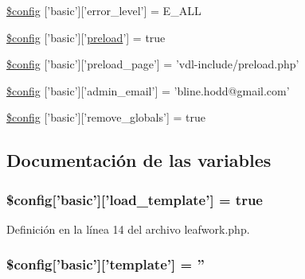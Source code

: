 \begin{DoxyCompactItemize}
\hyperlink{config_2leafwork_8php_a02fae42f7bd39779a246e6eef57ea649}{\$config} \mbox{[}'basic'\mbox{]}\mbox{[}'error\-\_\-level'\mbox{]} = E\-\_\-\-A\-L\-L
\item 
\hyperlink{config_2leafwork_8php_ab18150a408cc72381f076781e1d2c5f7}{\$config} \mbox{[}'basic'\mbox{]}\mbox{[}'\hyperlink{core_2leafwork_8php_a9a850f83b0ef276b15990509daca45cf}{preload}'\mbox{]} = true
\item 
\hyperlink{config_2leafwork_8php_a1d820c59c553e9ef698341bea6cb583b}{\$config} \mbox{[}'basic'\mbox{]}\mbox{[}'preload\-\_\-page'\mbox{]} = 'vdl-\/include/preload.\-php'
\item 
\hyperlink{config_2leafwork_8php_a9ba3340a1a3d600f3032680c1ccca82f}{\$config} \mbox{[}'basic'\mbox{]}\mbox{[}'admin\-\_\-email'\mbox{]} = 'bline.\-hodd@gmail.\-com'
\item 
\hyperlink{config_2leafwork_8php_a960f169c5af87b19aaf919499f37de03}{\$config} \mbox{[}'basic'\mbox{]}\mbox{[}'remove\-\_\-globals'\mbox{]} = true
\end{DoxyCompactItemize}


\subsection{Documentación de las variables}
\hypertarget{config_2leafwork_8php_a075b975d77f5da88d2feb10378a147c5}{
\subsubsection[{\$config}]{\setlength{\rightskip}{0pt plus 5cm}\${\bf config}\mbox{[}'basic'\mbox{]}\mbox{[}'load\-\_\-template'\mbox{]} = true}}\label{config_2leafwork_8php_a075b975d77f5da88d2feb10378a147c5}


Definición en la línea 14 del archivo leafwork.\-php.

\hypertarget{config_2leafwork_8php_a07f27d8d23db662a791185cdfda107c6}{
\subsubsection[{\$config}]{\setlength{\rightskip}{0pt plus 5cm}\${\bf config}\mbox{[}'basic'\mbox{]}\mbox{[}'template'\mbox{]} = ''}}\label{config_2leafwork_8php_a07f27d8d23db662a791185cdfda107c6}


